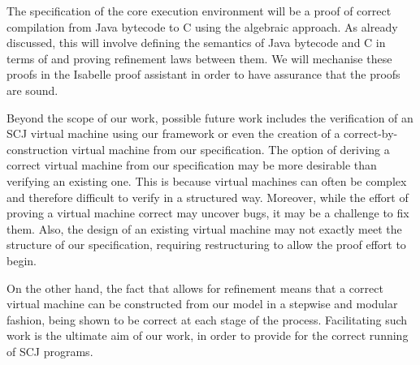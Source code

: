 \documentclass[a4paper,10pt]{report}
\begin{document}
The specification of the core execution environment will be a proof of
correct compilation from Java bytecode to C using the algebraic
approach.
As already discussed, this will involve defining the semantics of Java
bytecode and C in terms of \Circus{} and proving refinement laws
between them.
We will mechanise these proofs in the Isabelle proof assistant in
order to have assurance that the proofs are sound.

Beyond the scope of our work, possible future work includes the
verification of an SCJ virtual machine using our framework or even the
creation of a correct-by-construction virtual machine from our
specification.
The option of deriving a correct virtual machine from our
specification may be more desirable than verifying an existing one.
This is because virtual machines can often be complex and therefore
difficult to verify in a structured way.
Moreover, while the effort of proving a virtual machine correct may
uncover bugs, it may be a challenge to fix them.
Also, the design of an existing virtual machine may not exactly meet
the structure of our specification, requiring restructuring to allow
the proof effort to begin.

On the other hand, the fact that \Circus{} allows for refinement means
that a correct virtual machine can be constructed from our model in a
stepwise and modular fashion, being shown to be correct at each stage
of the process.
Facilitating such work is the ultimate aim of our work, in order to
provide for the correct running of SCJ programs.

\raggedright \printbibliography
\end{document}
